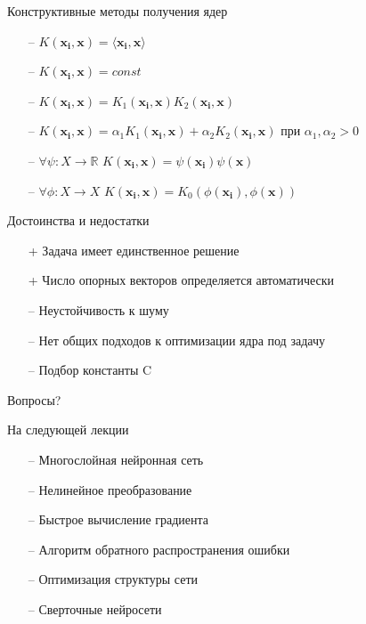 \documentclass[12pt]{beamer}
\begin{document}
\begin{frame}{Конструктивные методы получения ядер}
	\begin{itemize}
		\item[--] $K(\mathbf{x_i}, \mathbf{x}) = \langle \mathbf{x_i}, \mathbf{x} \rangle$
		\item[--] $K(\mathbf{x_i}, \mathbf{x}) = const$
		\item[--] $K(\mathbf{x_i}, \mathbf{x}) = K_1(\mathbf{x_i}, \mathbf{x}) K_2(\mathbf{x_i}, \mathbf{x})$
		\item[--] $K(\mathbf{x_i}, \mathbf{x}) = \alpha_1 K_1(\mathbf{x_i}, \mathbf{x}) + \alpha_2 K_2(\mathbf{x_i}, \mathbf{x})$ при  $\alpha_1, \alpha_2 > 0$
		\item[--] $\forall \psi: X \rightarrow \mathbb{R}$ \hspace{5mm}$K(\mathbf{x_i}, \mathbf{x}) = \psi(\mathbf{x_i}) \psi(\mathbf{x})$
		\item[--] $\forall \phi: X \rightarrow X$ \hspace{5mm}$K(\mathbf{x_i}, \mathbf{x}) = K_0(\phi(\mathbf{x_i}),  \phi(\mathbf{x}))$
	\end{itemize}
\end{frame}

\begin{frame}{Достоинства и недостатки}
	\begin{itemize}[<+->]
		\item[+] Задача имеет единственное решение
		\item[+] Число опорных векторов определяется автоматически
	  \bigbreak
	
		\item[--] Неустойчивость к шуму
		\item[--] Нет общих подходов к оптимизации ядра под задачу
		\item[--] Подбор константы C
	\end{itemize}
\end{frame}

\begin{frame}[standout]
  Вопросы?
\end{frame}

\appendix

\begin{frame}{На следующей лекции}
	\begin{itemize}
    	\item[--] Многослойная нейронная сеть
    	\item[--] Нелинейное преобразование
    	\item[--] Быстрое вычисление градиента
    	\item[--] Алгоритм обратного распространения ошибки
    	\item[--] Оптимизация структуры сети
    	\item[--] Сверточные нейросети
	\end{itemize}
\end{frame}
\end{document}
